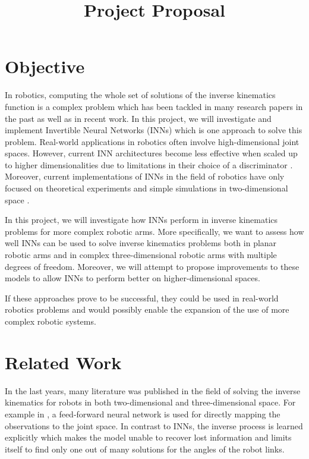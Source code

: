 \documentclass[conference]{IEEEtran}
\begin{document}
\nocite{*}

\title{Project Proposal}

\author{
    \and
}

\maketitle

\section*{Objective}

In robotics, computing the whole set of solutions of the inverse kinematics function is a complex problem which has been tackled in many research papers in the past as well as in recent work. In this project, we will investigate and implement Invertible Neural Networks (INNs) \cite{Ardizzone2018} which is one approach to solve this problem. Real-world applications in robotics often involve high-dimensional joint spaces. However, current INN architectures become less effective when scaled up to higher dimensionalities due to limitations in their choice of a discriminator \cite{Ardizzone2018}. Moreover, current implementations of INNs in the field of robotics have only focused on theoretical experiments and simple simulations in two-dimensional space \cite{Ardizzone2018}.

In this project, we will investigate how INNs perform in inverse kinematics problems for more complex robotic arms. More specifically, we want to assess how well INNs can be used to solve inverse kinematics problems
both in planar robotic arms and in complex three-dimensional robotic arms with multiple degrees of freedom. Moreover, we will attempt to propose improvements to these models to allow INNs to perform better on higher-dimensional spaces.

If these approaches prove to be successful, they could be used in real-world robotics problems
and would possibly enable the expansion of the use of more complex robotic systems.

\section*{Related Work}

In the last years, many literature was published in the field of solving the inverse kinematics for robots in both two-dimensional  and three-dimensional space. For example in \cite{Duka2014}, a feed-forward neural network is used for directly mapping the observations to the joint space. In contrast to INNs, the inverse process is learned explicitly which makes the model unable to recover lost information and limits itself to find only one out of many solutions for the angles of the robot links.
\end{document}
